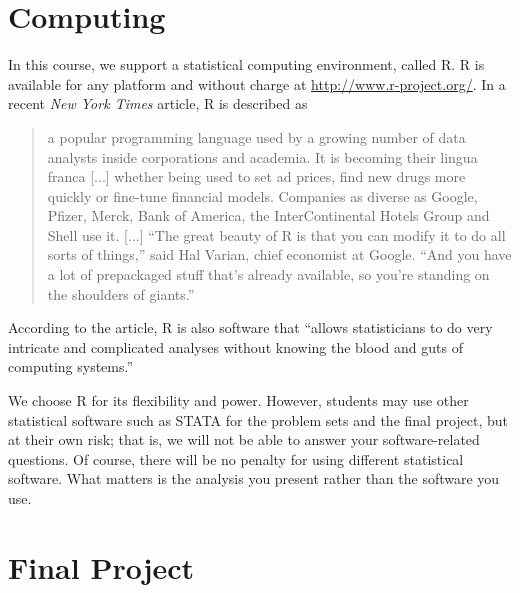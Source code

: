 \documentclass[11pt]{article}
\begin{document}
\section{Computing}

In this course, we support a statistical computing environment, called
R.  R is available for any platform and without charge at \href{
  http://www.r-project.org/}{http://www.r-project.org/}.  In a recent
{\it New York Times} article, R is described as 
\begin{quote}
  a popular programming language used by a growing number of data
  analysts inside corporations and academia.  It is becoming their
  lingua franca [...] whether being used to set ad prices, find new
  drugs more quickly or fine-tune financial models. Companies as
  diverse as Google, Pfizer, Merck, Bank of America, the
  InterContinental Hotels Group and Shell use it. [...] ``The great
  beauty of R is that you can modify it to do all sorts of things,''
  said Hal Varian, chief economist at Google. ``And you have a lot of
  prepackaged stuff that's already available, so you're standing on
  the shoulders of giants.''
\end{quote}
According to the article, R is also software that ``allows statisticians to do very intricate and complicated analyses without knowing the blood and guts of computing systems.'' 

We choose R for its flexibility and power.  However, students may use other statistical software such as STATA for the problem sets and the final project, but at their own risk; that is, we will not be able to answer your software-related questions.  Of course, there will be no penalty for using different statistical software.  What matters is the analysis you present rather than the software you use.

\section{Final Project}
\end{document}
